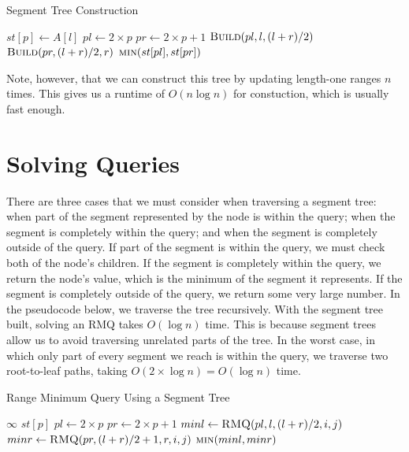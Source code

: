 \documentclass[11pt]{article}
\begin{document}
\begin{algorithm}[H]
\caption{Segment Tree Construction}
\begin{algorithmic}
            \State $st[p] \gets A[l]$
        \Else
            \State $pl \gets 2 \times p$
            \State $pr \gets 2 \times p + 1$
            \State $\Call{Build}{pl, l, (l + r) / 2}$
            \State $\Call{Build}{pr, (l + r) / 2, r}$
            \State \Return $\Call{min}{st[pl], st[pr]}$
        \EndIf
    \EndFunction
\end{algorithmic}
\end{algorithm}

Note, however, that we can construct this tree by updating length-one ranges $n$ times. This gives us a runtime of $O(n \log n)$ for constuction, which is usually fast enough.

\section{Solving Queries}

There are three cases that we must consider when traversing a segment tree: when part of the segment represented by the node is within the query; when the segment is completely within the query; and when the segment is completely outside of the query. If part of the segment is within the query, we must check both of the node's children. If the segment is completely within the query, we return the node's value, which is the minimum of the segment it represents. If the segment is completely outside of the query, we return some very large number. In the pseudocode below, we traverse the tree recursively. With the segment tree built, solving an RMQ takes $O(\log n)$ time. This is because segment trees allow us to avoid traversing unrelated parts of the tree. In the worst case, in which only part of every segment we reach is within the query, we traverse two root-to-leaf paths, taking $O(2 \times \log n) = O(\log n)$ time.

\begin{algorithm}[H]
\caption{Range Minimum Query Using a Segment Tree}
\begin{algorithmic}
            \State \Return $\infty$
        \EndIf
            \State \Return $st[p]$
        \EndIf
        \State $pl \gets 2 \times p$
        \State $pr \gets 2 \times p + 1$
        \State $minl \gets \Call{RMQ}{pl, l, (l + r) / 2, i, j}$
        \State $minr \gets \Call{RMQ}{pr, (l + r) / 2 + 1, r, i, j}$
        \State \Return $\Call{min}{minl, minr}$
    \EndFunction
\end{algorithmic}
\end{algorithm}
\end{document}
